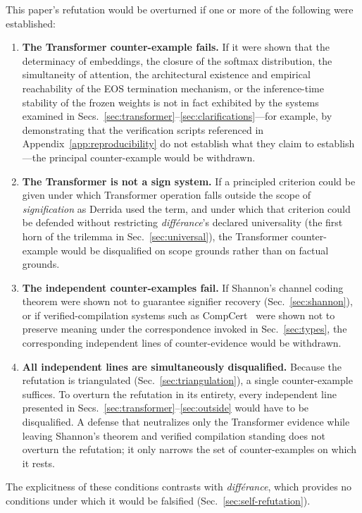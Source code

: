 \documentclass[a4paper,twocolumn,11pt]{article}
\begin{document}
This paper's refutation would be overturned if one or more of the following were established:
\begin{enumerate}[noitemsep]
\item \textbf{The Transformer counter-example fails.} If it were shown that the determinacy of embeddings, the closure of the softmax distribution, the simultaneity of attention, the architectural existence and empirical reachability of the EOS termination mechanism, or the inference-time stability of the frozen weights is not in fact exhibited by the systems examined in Secs.~\ref{sec:transformer}--\ref{sec:clarifications}---for example, by demonstrating that the verification scripts referenced in Appendix~\ref{app:reproducibility} do not establish what they claim to establish---the principal counter-example would be withdrawn.
\item \textbf{The Transformer is not a sign system.} If a principled criterion could be given under which Transformer operation falls outside the scope of \emph{signification} as Derrida used the term, and under which that criterion could be defended without restricting \emph{diff\'erance}'s declared universality (the first horn of the trilemma in Sec.~\ref{sec:universal}), the Transformer counter-example would be disqualified on scope grounds rather than on factual grounds.
\item \textbf{The independent counter-examples fail.} If Shannon's channel coding theorem were shown not to guarantee signifier recovery (Sec.~\ref{sec:shannon}), or if verified-compilation systems such as CompCert~\cite{Leroy2009} were shown not to preserve meaning under the correspondence invoked in Sec.~\ref{sec:types}, the corresponding independent lines of counter-evidence would be withdrawn.
\item \textbf{All independent lines are simultaneously disqualified.} Because the refutation is triangulated (Sec.~\ref{sec:triangulation}), a single counter-example suffices. To overturn the refutation in its entirety, every independent line presented in Secs.~\ref{sec:transformer}--\ref{sec:outside} would have to be disqualified. A defense that neutralizes only the Transformer evidence while leaving Shannon's theorem and verified compilation standing does not overturn the refutation; it only narrows the set of counter-examples on which it rests.
\end{enumerate}

The explicitness of these conditions contrasts with \emph{diff\'erance}, which provides no conditions under which it would be falsified (Sec.~\ref{sec:self-refutation}).
\end{document}
